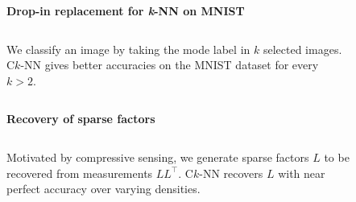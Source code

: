 \documentclass{beamer}                             %
\newcommand{\blocktitle}[1]{{\Large \textbf{#1}}}
\begin{document}
\begin{frame}[t]
\begin{columns}[T]
\begin{column}{0.01\textwidth}
  \begin{center}
    \textcolor{darksilver}{\rule[-1cm]{1mm}{0.8\textheight}}
  \end{center}
\end{column}


\begin{column}{0.30\textwidth}
  \begin{tcolorbox}
    \blocktitle{Drop-in replacement for \textit{k}-NN on MNIST}

    \begin{columns}
      \hfill
      \begin{column}{0.5\textwidth}
        We classify an image by taking the mode label in
        \( k \) selected images. C\( k \)-NN gives better
        accuracies on the MNIST dataset for every \( k > 2 \).
      \end{column}
      \begin{column}{0.5\textwidth}
        \begin{figure}[t]
          \centering
          \label{fig:mnist}
        \end{figure}
      \end{column}
    \end{columns}
  \end{tcolorbox}

  \begin{tcolorbox}
    \blocktitle{Recovery of sparse factors}

    \begin{columns}
      \hfill
      \begin{column}{0.5\textwidth}
        Motivated by compressive sensing, we generate sparse factors \( L
        \) to be recovered from measurements \( L L^{\top} \). C\( k \)-NN
        recovers \( L \) with near perfect accuracy over varying densities.
      \end{column}
      \begin{column}{0.5\textwidth}
        \begin{figure}[t]
          \centering
          
          \label{fig:recover_acc}
        \end{figure}
      \end{column}
    \end{columns}
  \end{tcolorbox}


\end{column}
\end{columns}
\end{frame}
\end{document}
